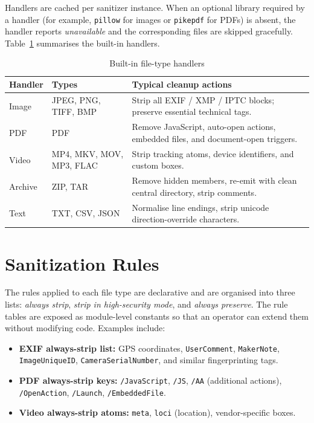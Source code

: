 \documentclass[12pt, a4paper]{report}
\begin{document}
Handlers are cached per sanitizer instance. When an optional library
required by a handler (for example, \texttt{pillow} for images or
\texttt{pikepdf} for PDFs) is absent, the handler reports
\emph{unavailable} and the corresponding files are skipped gracefully.
Table~\ref{tab:handlers} summarises the built-in handlers.

\begin{table}[H]
\centering
\caption{Built-in file-type handlers}
\label{tab:handlers}
\begin{tabular}{|l|l|p{7cm}|}
\hline
\textbf{Handler} & \textbf{Types} & \textbf{Typical cleanup actions} \\
\hline
Image & JPEG, PNG, TIFF, BMP & Strip all EXIF / XMP / IPTC blocks; preserve essential technical tags. \\
\hline
PDF & PDF & Remove JavaScript, auto-open actions, embedded files, and document-open triggers. \\
\hline
Video & MP4, MKV, MOV, MP3, FLAC & Strip tracking atoms, device identifiers, and custom boxes. \\
\hline
Archive & ZIP, TAR & Remove hidden members, re-emit with clean central directory, strip comments. \\
\hline
Text & TXT, CSV, JSON & Normalise line endings, strip unicode direction-override characters. \\
\hline
\end{tabular}
\end{table}

\section{Sanitization Rules}

The rules applied to each file type are declarative and are organised
into three lists: \emph{always strip}, \emph{strip in high-security
mode}, and \emph{always preserve}. The rule tables are exposed as
module-level constants so that an operator can extend them without
modifying code. Examples include:

\begin{itemize}
    \item \textbf{EXIF always-strip list:} GPS coordinates,
          \texttt{UserComment}, \texttt{MakerNote}, \texttt{ImageUniqueID},
          \texttt{CameraSerialNumber}, and similar fingerprinting tags.
    \item \textbf{PDF always-strip keys:} \texttt{/JavaScript},
          \texttt{/JS}, \texttt{/AA} (additional actions),
          \texttt{/OpenAction}, \texttt{/Launch}, \texttt{/EmbeddedFile}.
    \item \textbf{Video always-strip atoms:} \texttt{meta}, \texttt{loci}
          (location), vendor-specific boxes.
\end{itemize}
\end{document}
